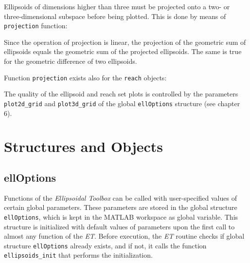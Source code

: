 \documentclass{report}
\begin{document}
Ellipsoids of dimensions higher than three must be
projected onto a two- or three-dimensional subspace before being plotted.
This is done by means of {\tt projection} function:

Since the operation of projection is linear, the projection of the geometric
sum of ellipsoids equals the geometric sum of the projected ellipsoids.
The same is true for the geometric difference of two ellipsoids.

Function {\tt projection} exists also for the {\tt reach} objects:

The quality of the ellipsoid and reach set plots is controlled by the
parameters {\tt plot2d\_grid} and {\tt plot3d\_grid} of the global
{\tt ellOptions} structure (see chapter 6).





\chapter{Structures and Objects}
\section{ellOptions}
Functions of the {\it Ellipsoidal Toolbox} can be called with
user-specified values of certain global parameters. These parameters
are stored in the global structure {\tt ellOptions}, which is kept in the
MATLAB workspace as global variable. This structure is initialized with
default values of parameters upon the first call to almost any function
of the {\it ET}. Before  execution, the {\it ET} routine checks
if global structure {\tt ellOptions} already exists, and if not, it calls
the function {\tt ellipsoids\_init} that performs the initialization.
\end{document}
